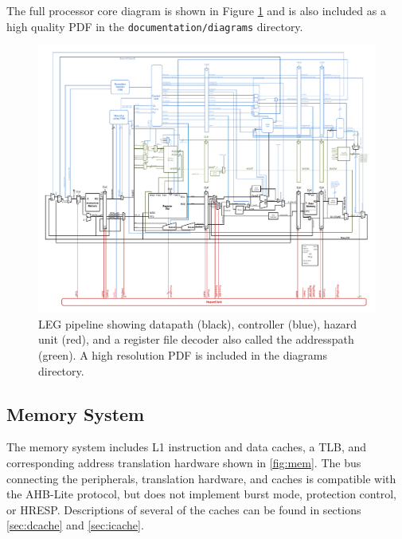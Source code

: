 The full processor core diagram is shown in Figure \ref{fig:pipelinedfull} and is also included as a high quality PDF in the \texttt{documentation/diagrams} directory.

\begin{figure}[h!]
\centering
\includegraphics[width=\textwidth]{./diagrams/pipelinedfull.pdf}
\caption{LEG pipeline showing datapath (black), controller (blue), hazard unit (red), and a register file decoder also called the addresspath (green). A high resolution PDF is included in the diagrams directory.}
\label{fig:pipelinedfull}
\end{figure}

\subsection{Memory System}
The memory system includes L1 instruction and data
caches, a TLB, and corresponding address translation hardware shown in \ref{fig:mem}. The bus connecting the peripherals, translation hardware, and caches is compatible with the AHB-Lite protocol, but does not implement burst mode, protection control, or HRESP.
Descriptions of several of the caches can be found in sections \ref{sec:dcache} and \ref{sec:icache}.

